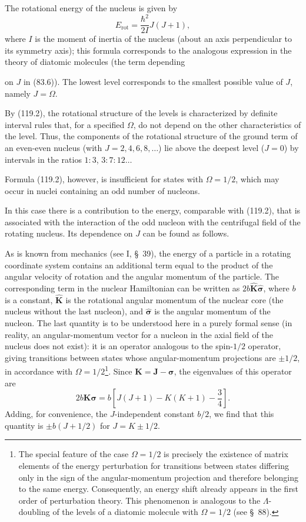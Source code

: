The rotational energy of the nucleus is given by
\begin{equation}
 E_{\mathrm{rot}}=\frac{\hbar^2}{2I}J(J+1),
 \tag{119.2}
\end{equation}
where $I$ is the moment of inertia of the nucleus (about an axis perpendicular to its symmetry axis); this formula corresponds to the analogous expression in the theory of diatomic molecules (the term depending

on $J$ in (83.6)). The lowest level corresponds to the smallest possible value of $J$, namely $J=\Omega$.

By (119.2), the rotational structure of the levels is characterized by definite interval rules that, for a specified $\Omega$, do not depend on the other characteristics of the level. Thus, the components of the rotational structure of the ground term of an even-even nucleus (with $J=2,4,6,8,\ldots$) lie above the deepest level ($J=0$) by intervals in the ratios $1:3$, $3:7:12\ldots$

Formula (119.2), however, is insufficient for states with $\Omega=1/2$, which may occur in nuclei containing an odd number of nucleons.

In this case there is a contribution to the energy, comparable with (119.2), that is associated with the interaction of the odd nucleon with the centrifugal field of the rotating nucleus. Its dependence on $J$ can be found as follows.

As is known from mechanics (see I, \S~39), the energy of a particle in a rotating coordinate system contains an additional term equal to the product of the angular velocity of rotation and the angular momentum of the particle. The corresponding term in the nuclear Hamiltonian can be written as $2b\hat{\mathbf K}\hat{\boldsymbol\sigma}$, where $b$ is a constant, $\hat{\mathbf K}$ is the rotational angular momentum of the nuclear core (the nucleus without the last nucleon), and $\hat{\boldsymbol\sigma}$ is the angular momentum of the nucleon. The last quantity is to be understood here in a purely formal sense (in reality, an angular-momentum vector for a nucleon in the axial field of the nucleus does not exist): it is an operator analogous to the spin-$1/2$ operator, giving transitions between states whose angular-momentum projections are $\pm1/2$, in accordance with $\Omega=1/2$\footnote{The special feature of the case $\Omega=1/2$ is precisely the existence of matrix elements of the energy perturbation for transitions between states differing only in the sign of the angular-momentum projection and therefore belonging to the same energy. Consequently, an energy shift already appears in the first order of perturbation theory. This phenomenon is analogous to the $\Lambda$-doubling of the levels of a diatomic molecule with $\Omega=1/2$ (see \S~88).}. Since $\mathbf K=\mathbf J-\boldsymbol\sigma$, the eigenvalues of this operator are
\[
 2b\mathbf K\boldsymbol\sigma
 =b\left[J(J+1)-K(K+1)-\frac34\right].
\]
Adding, for convenience, the $J$-independent constant $b/2$, we find that this quantity is $\pm b(J+1/2)$ for $J=K\pm1/2$.

